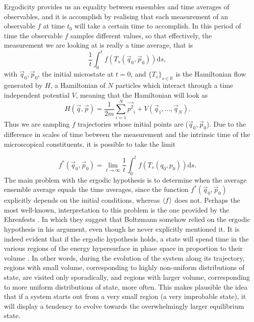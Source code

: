 \indent Ergodicity provides us an equality between ensembles and time averages of observables, and it is accomplish by realising that each measurement of an observable $f$ at time $t_0$ will take a certain time to accomplish. In this period of time the observable $f$ samples different values, so that effectively, the measurement we are looking at is really a time average, that is
\begin{equation}
\frac{1}{t} \int_{0}^{t} f\left(T_{s}\left(\vec{q}_{0}, \vec{p}_{0}\right)\right) \mathrm{d} s,
\end{equation}
with $\vec{q}_{0}, \vec{p}_{0}$, the initial microstate at $t=0$, and $\{T_s\}_{s\in \mathbb{R}}$ is the Hamiltonian flow generated by $H$, a Hamiltonian of $N$ particles which interact through a time independent potential $V$, meaning that the Hamiltonian will look as
\begin{equation}
H(\vec{q}, \vec{p})=\frac{1}{2 m} \sum_{i=1}^{N} \vec{p^{2}}_{i}+V\left(\vec{q}_{1}, \ldots, \vec{q}_{N}\right).
\end{equation}
Thus we are sampling $f$ trajectories whose initial points are ($\vec{q}_0, \vec{p}_0$).  Due to the difference in scales of time between the measurement and the intrinsic time of the microscopical constituents, it is possible to take the limit

\begin{equation}
f^{*}\left(\vec{q}_{0},\vec{p}_{0}\right)=\lim _{t \rightarrow \infty} \frac{1}{t} \int_{0}^{t} f\left(T_{s}\left(q_{0}, p_{0}\right)\right) \mathrm{d} s.
\label{CH1:Ergodicity_1}
\end{equation}
The main problem with the ergodic hypothesis is to determine when the average ensemble average equals the time averages, since the function $f^{*}(\vec{q}_{0},\vec{p}_{0})$ explicitly depends on the initial conditions, whereas $\mathinner{\langle{f}\rangle}$ does not. Perhaps the most well-known, interpretation to this problem is the one provided by the Ehrenfests \cite{ehrenfest_conceptual_1959}. In which they suggest that Boltzmann somehow relied on the ergodic hypothesis in his argument, even though he never explicitly mentioned it. It is indeed evident that if the ergodic hypothesis holds, a state will spend time in the various regions of the energy hypersurface in phase space in proportion to their volume  \cite{oliveira_ergodic_2007, engelhardt_simple_2015, gallavotti_statistical_1999,goldstein_boltzmanns_2001,uffink_handbook_2007}. In other words, during the evolution of the system along its trajectory, regions with small volume, corresponding to highly non-uniform distributions of state, are visited only sporadically, and regions with larger volume, corresponding to more uniform distributions of state, more often. This makes plausible the idea that if a system starts out from a very small region (a very improbable state), it will display a tendency to evolve towards the overwhelmingly larger equilibrium state. \\

